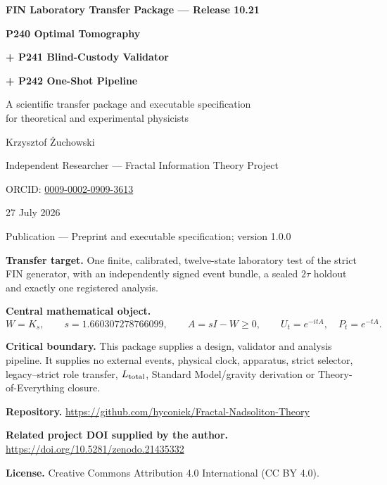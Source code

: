\documentclass[11pt,a4paper,openany]{report}
\begin{document}
\hypersetup{pageanchor=false}
\begin{titlepage}
\centering
\vspace*{7mm}
{\Large\bfseries FIN Laboratory Transfer Package --- Release 10.21\par}
\vspace{10mm}
{\Huge\bfseries P240 Optimal Tomography\par}
\vspace{3mm}
{\Huge\bfseries + P241 Blind-Custody Validator\par}
\vspace{3mm}
{\Huge\bfseries + P242 One-Shot Pipeline\par}
\vspace{8mm}
{\Large A scientific transfer package and executable specification\\
for theoretical and experimental physicists\par}
\vspace{15mm}
{\Large Krzysztof \.Zuchowski\par}
\vspace{2mm}
{\normalsize Independent Researcher --- Fractal Information Theory Project\par}
\vspace{2mm}
{\normalsize ORCID: \href{https://orcid.org/0009-0002-0909-3613}{0009-0002-0909-3613}\par}
\vspace{8mm}
{\large 27 July 2026\par}
{\normalsize Publication --- Preprint and executable specification; version 1.0.0\par}
\vfill
\begin{minipage}{0.91\textwidth}
\small
\textbf{Transfer target.} One finite, calibrated, twelve-state laboratory
test of the strict FIN generator, with an independently signed event bundle,
a sealed \(2\tau\) holdout and exactly one registered analysis.

\medskip
\textbf{Central mathematical object.}
\[
W=K_s,\qquad s=1.660307278766099,\qquad
A=sI-W\geq0,\qquad U_t=e^{-itA},\quad P_t=e^{-tA}.
\]

\textbf{Critical boundary.} This package supplies a design, validator and
analysis pipeline. It supplies no external events, physical clock, apparatus,
strict selector, legacy--strict role transfer, \(L_{\rm total}\), Standard
Model/gravity derivation or Theory-of-Everything closure.

\medskip
\textbf{Repository.}
\url{https://github.com/hyconiek/Fractal-Nadsoliton-Theory}

\textbf{Related project DOI supplied by the author.}
\url{https://doi.org/10.5281/zenodo.21435332}

\textbf{License.} Creative Commons Attribution 4.0 International (CC BY 4.0).
\end{minipage}
\vfill
\end{titlepage}
\hypersetup{pageanchor=true}
\end{document}
